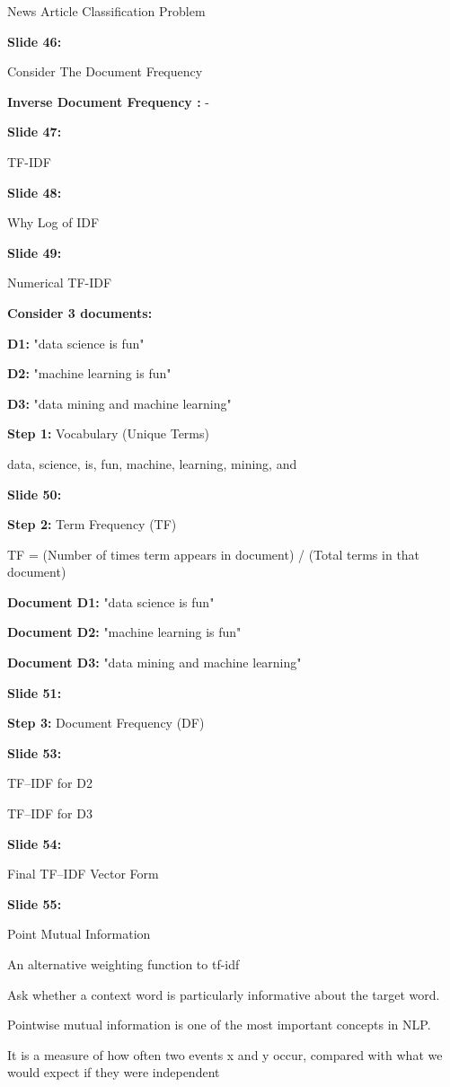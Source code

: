 \documentclass[11pt,a4paper]{article}
\begin{document}
News Article Classification Problem

\textbf{Slide 46:}

Consider The Document Frequency

\textbf{Inverse Document Frequency :} -

\textbf{Slide 47:}

TF-IDF

\textbf{Slide 48:}

Why Log of IDF

\textbf{Slide 49:}

Numerical TF-IDF

\textbf{Consider 3 documents:} 

\textbf{D1:}  "data science is fun"

\textbf{D2:}  "machine learning is fun"

\textbf{D3:}  "data mining and machine learning"

\textbf{Step 1:}  Vocabulary (Unique Terms)

data, science, is, fun, machine, learning, mining, and

\textbf{Slide 50:}

\textbf{Step 2:}  Term Frequency (TF)

TF = (Number of times term appears in document) / (Total terms in that document)

\textbf{Document D1:}  "data science is fun"

\textbf{Document D2:}  "machine learning is fun"

\textbf{Document D3:}  "data mining and machine learning"

\textbf{Slide 51:}

\textbf{Step 3:}  Document Frequency (DF)

\textbf{Slide 53:}

TF–IDF for D2

TF–IDF for D3

\textbf{Slide 54:}

Final TF–IDF Vector Form

\textbf{Slide 55:}

Point Mutual Information

An alternative weighting function to tf-idf

Ask whether a context word is particularly informative about the target word.

Pointwise mutual information is one of the most important concepts in NLP.

It is a measure of how often two events x and y occur, compared with what we would expect if they were independent
\end{document}

